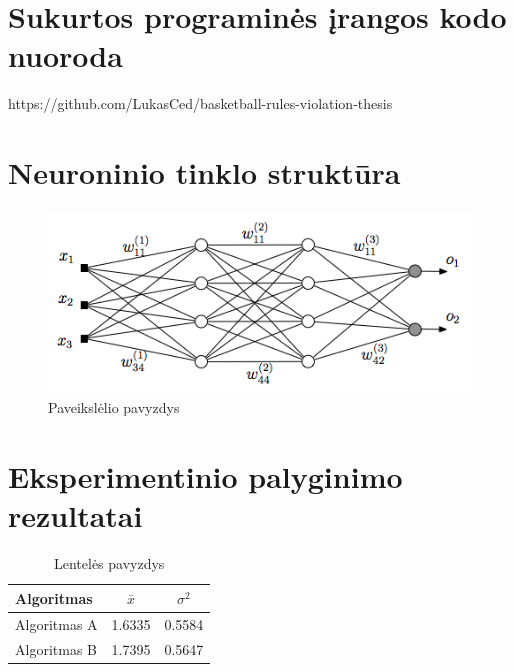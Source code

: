 \documentclass{VUMIFPSbakalaurinis}
\begin{document}
\appendix  %

\section{Sukurtos programinės įrangos kodo nuoroda}
https://github.com/LukasCed/basketball-rules-violation-thesis

\section{Neuroninio tinklo struktūra}
\begin{figure}[H]
    \centering
    \includegraphics[scale=0.5]{img/MLP}
    \caption{Paveikslėlio pavyzdys}
    \label{img:mlp}
\end{figure}


\section{Eksperimentinio palyginimo rezultatai}
\begin{table}[H]\footnotesize
  \centering
  \caption{Lentelės pavyzdys}
  {\begin{tabular}{|l|c|c|} \hline
    Algoritmas & $\bar{x}$ & $\sigma^{2}$ \\
    \hline
    Algoritmas A  & 1.6335    & 0.5584       \\
    Algoritmas B  & 1.7395    & 0.5647       \\
    \hline
  \end{tabular}}
  \label{tab:table example}
\end{table}
\end{document}

